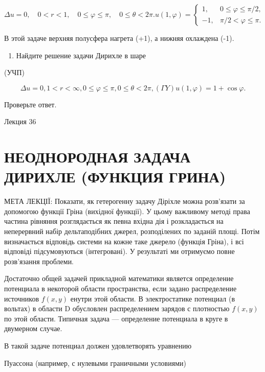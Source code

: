 \documentclass[
  ukrainian,
]{article}
\providecommand{\tightlist}{%
  \setlength{\itemsep}{0pt}\setlength{\parskip}{0pt}}
\begin{document}
\[
\Delta u = 0, \quad 0 < r < 1, \quad 0 \le \varphi \le \pi, \quad 0 \le \theta < 2\pi.
u(1, \varphi) =
\begin{cases} 1, & 0 \le \varphi \le \pi/2, \\ -1, & \pi/2 < \varphi \le \pi. \end{cases}
\]

В этой задаче верхняя полусфера нагрета (+1), а нижняя охлаждена (-1).

\begin{enumerate}
\def\labelenumi{\arabic{enumi}.}
\setcounter{enumi}{5}
\tightlist
\item
  Найдите решение задачи Дирихле в шаре
\end{enumerate}

(УЧП)

\[
\Delta u = 0
,  1 < r < \infty  ,  0 \le \varphi \le \pi  ,  0 \le \theta < 2\pi  ,  (\Gamma Y)   u(1, \varphi) = 1 + \cos \varphi  .
\]

Проверьте ответ.

Лекция 36

\section{НЕОДНОРОДНАЯ ЗАДАЧА ДИРИХЛЕ (ФУНКЦИЯ
ГРИНА)}\label{ux43dux435ux43eux434ux43dux43eux440ux43eux434ux43dux430ux44f-ux437ux430ux434ux430ux447ux430-ux434ux438ux440ux438ux445ux43bux435-ux444ux443ux43dux43aux446ux438ux44f-ux433ux440ux438ux43dux430}

МЕТА ЛЕКЦІЇ: Показати, як гетерогенну задачу Діріхле можна розв'язати за
допомогою функції Гріна (вихідної функції). У цьому важливому методі
права частина рівняння розглядається як певна вхідна дія і розкладається
на неперервний набір дельтаподібних джерел, розподілених по заданій
площі. Потім визначається відповідь системи на кожне таке джерело
(функція Гріна), і всі відповіді підсумовуються (інтегровані). У
результаті ми отримуємо повне розв'язання проблеми.

Достаточно общей задачей прикладной математики является определение
потенциала в некоторой области пространства, если задано распределение
источников \(f(x, y)\) енутри этой области. В электростатике потенциал
(в вольтах) в области D обусловлен распределением зарядов с плотностью
\(f(x, y)\) по этой области. Типичная задача --- определение потенциала
в круге в двумерном случае.

В такой задаче потенциал должен удовлетворять уравнению

Пуассона (например, с нулевыми граничными условиями)
\end{document}
